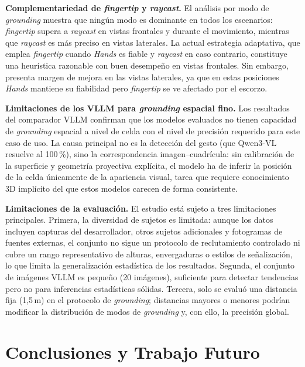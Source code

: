 \documentclass[12pt]{report} %
\begin{document}
\textbf{Complementariedad de \textit{fingertip} y \textit{raycast}.} El análisis por modo de \textit{grounding} muestra que ningún modo es dominante en todos los escenarios: \textit{fingertip} supera a \textit{raycast} en vistas frontales y durante el movimiento, mientras que \textit{raycast} es más preciso en vistas laterales. La actual estrategia adaptativa, que emplea \textit{fingertip} cuando \textit{Hands} es fiable y \textit{raycast} en caso contrario, constituye una heurística razonable con buen desempeño en vistas frontales. Sin embargo, presenta margen de mejora en las vistas laterales, ya que en estas posiciones \textit{Hands} mantiene su fiabilidad pero \textit{fingertip} se ve afectado por el escorzo.

\textbf{Limitaciones de los VLLM para \textit{grounding} espacial fino.} Los resultados del comparador VLLM confirman que los modelos evaluados no tienen capacidad de \textit{grounding} espacial a nivel de celda con el nivel de precisión requerido para este caso de uso. La causa principal no es la detección del gesto (que Qwen3-VL resuelve al 100\,\%), sino la correspondencia imagen--cuadrícula: sin calibración de la superficie y geometría proyectiva explícita, el modelo ha de inferir la posición de la celda únicamente de la apariencia visual, tarea que requiere conocimiento 3D implícito del que estos modelos carecen de forma consistente.

\textbf{Limitaciones de la evaluación.} El estudio está sujeto a tres limitaciones principales. Primera, la diversidad de sujetos es limitada: aunque los datos incluyen capturas del desarrollador, otros sujetos adicionales y fotogramas de fuentes externas, el conjunto no sigue un protocolo de reclutamiento controlado ni cubre un rango representativo de alturas, envergaduras o estilos de señalización, lo que limita la generalización estadística de los resultados. Segunda, el conjunto de imágenes VLLM es pequeño (20 imágenes), suficiente para detectar tendencias pero no para inferencias estadísticas sólidas. Tercera, solo se evaluó una distancia fija (1{,}5\,m) en el protocolo de \textit{grounding}; distancias mayores o menores podrían modificar la distribución de modos de \textit{grounding} y, con ello, la precisión global.


\chapter{Conclusiones y Trabajo Futuro}
\label{chap:conclusiones}
\end{document}
